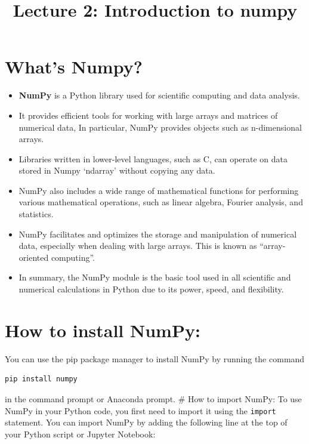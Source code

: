 \documentclass[11pt]{article}
\title{Lecture 2: Introduction to numpy}
\date{}
\providecommand{\tightlist}{%
      \setlength{\itemsep}{0pt}\setlength{\parskip}{0pt}}
\begin{document}
    
    \maketitle
    
    

    
    \hypertarget{whats-numpy}{%
\section{What's Numpy?}\label{whats-numpy}}

\begin{itemize}
\tightlist
\item
  \textbf{NumPy} is a Python library used for scientific computing and
  data analysis.
\item
  It provides efficient tools for working with large arrays and matrices
  of numerical data, In particular, NumPy provides objects such as
  n-dimensional arrays.
\item
  Libraries written in lower-level languages, such as C, can operate on
  data stored in Numpy `ndarray' without copying any data.
\item
  NumPy also includes a wide range of mathematical functions for
  performing various mathematical operations, such as linear algebra,
  Fourier analysis, and statistics.
\item
  NumPy facilitates and optimizes the storage and manipulation of
  numerical data, especially when dealing with large arrays. This is
  known as ``array-oriented computing''.
\item
  In summary, the NumPy module is the basic tool used in all scientific
  and numerical calculations in Python due to its power, speed, and
  flexibility.
\end{itemize}

\hypertarget{how-to-install-numpy}{%
\section{How to install NumPy:}\label{how-to-install-numpy}}

You can use the pip package manager to install NumPy by running the
command

\begin{verbatim}
pip install numpy
\end{verbatim}

in the command prompt or Anaconda prompt. \# How to import NumPy: To use
NumPy in your Python code, you first need to import it using the
\texttt{import} statement. You can import NumPy by adding the following
line at the top of your Python script or Jupyter Notebook:
\end{document}
